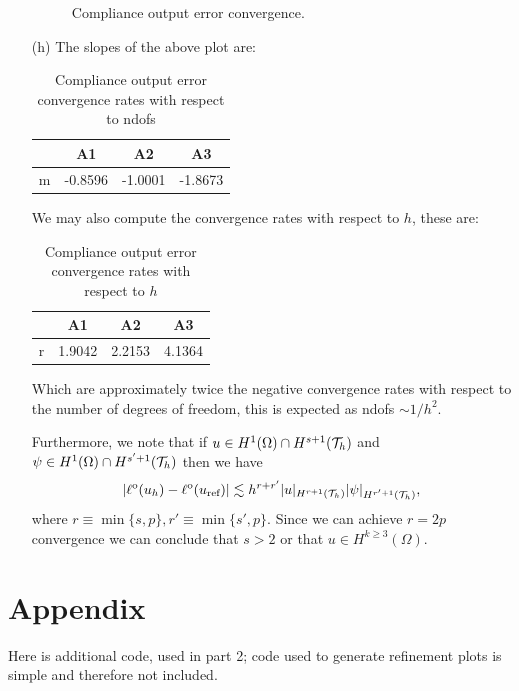 \documentclass{article}
\begin{document}
\begin{itemize}
\begin{figure}[H]
		\caption{Compliance output error convergence.}
		\label{out_err_conv}
	\end{figure}
	\item[(h)] The slopes of the above plot are:\\
		\begin{table}[H]
			\centering
			\begin{tabular}{r||c|c|c}
				& A1 & A2 & A3 \\
				\hline
				m & -0.8596 & -1.0001 & -1.8673\\
			\end{tabular}
			\caption{Compliance output error convergence rates with respect to ndofs}
			\label{table2}
		\end{table}
		We may also compute the convergence rates with respect to \(h\), these are:\\
		\begin{table}[H]
			\centering
			\begin{tabular}{r||c|c|c}
				& A1 & A2 & A3 \\
				\hline
				r & 1.9042 & 2.2153 & 4.1364\\
			\end{tabular}
			\caption{Compliance output error convergence rates with respect to \(h\)}
			\label{table3}
		\end{table}
		
		Which are approximately twice the negative convergence rates with respect to the number of degrees of freedom, this is expected as ndofs \(\sim 1/h^2 \).
		
		Furthermore, we note that if \(u \in H^1(\Omega) \cap H^{s+1}(\mathcal{T}_h) \) and \(\psi \in H^1(\Omega) \cap H^{s'+1}(\mathcal{T}_h) \) then we have
		\begin{equation*}
			|\ell^\text{o}(u_h) - \ell^\text{o}(u_\text{ref})| \lesssim h^{r+r'}|u|_{H^{r+1}(\mathcal{T}_h)}|\psi|_{H^{r'+1}(\mathcal{T}_h)},
		\end{equation*}
		where \(r \equiv \min\{s,p\}, r' \equiv \min\{s',p\} \). Since we can achieve \(r=2p\) convergence we can conclude that \(s > 2\) or that \(u \in H^{k\geq3}(\Omega) \).
		
\end{itemize}

\section*{Appendix}
	Here is additional code, used in part 2; code used to generate refinement plots is simple and therefore not included.
	
\end{document}
